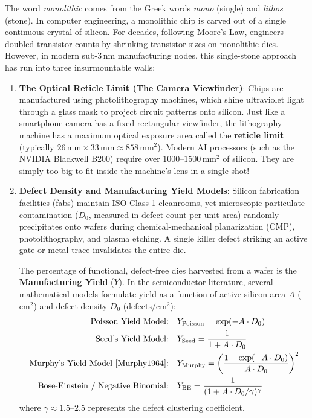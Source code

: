 The word \emph{monolithic} comes from the Greek words \emph{mono} (single) and \emph{lithos} (stone). In computer engineering, a monolithic chip is carved out of a single continuous crystal of silicon. For decades, following Moore's Law, engineers doubled transistor counts by shrinking transistor sizes on monolithic dies. However, in modern sub-3\,nm manufacturing nodes, this single-stone approach has run into three insurmountable walls:

\begin{enumerate}
    \item \textbf{The Optical Reticle Limit (The Camera Viewfinder)}: Chips are manufactured using photolithography machines, which shine ultraviolet light through a glass mask to project circuit patterns onto silicon. Just like a smartphone camera has a fixed rectangular viewfinder, the lithography machine has a maximum optical exposure area called the \textbf{reticle limit}~\cite{Mack2007} (typically $26\,\mathrm{mm} \times 33\,\mathrm{mm} \approx 858\,\mathrm{mm^2}$). Modern AI processors (such as the NVIDIA Blackwell B200) require over $1000\text{--}1500\,\mathrm{mm^2}$ of silicon. They are simply too big to fit inside the machine's lens in a single shot!
    
    \item \textbf{Defect Density and Manufacturing Yield Models}: Silicon fabrication facilities (fabs) maintain ISO Class 1 cleanrooms, yet microscopic particulate contamination ($D_0$, measured in defect count per unit area) randomly precipitates onto wafers during chemical-mechanical planarization (CMP), photolithography, and plasma etching. A single killer defect striking an active gate or metal trace invalidates the entire die.

    The percentage of functional, defect-free dies harvested from a wafer is the \textbf{Manufacturing Yield} ($Y$). In the semiconductor literature, several mathematical models formulate yield as a function of active silicon area $A$ ($\mathrm{cm^2}$) and defect density $D_0$ ($\mathrm{defects/cm^2}$):
    \begin{align}
    \text{Poisson Yield Model:} \quad & Y_{\mathrm{Poisson}} = \exp(-A \cdot D_0) \label{eq:yield_poisson} \\
    \text{Seed's Yield Model:} \quad & Y_{\mathrm{Seed}} = \frac{1}{1 + A \cdot D_0} \label{eq:yield_seed} \\
    \text{Murphy's Yield Model~\cite{Murphy1964}:} \quad & Y_{\mathrm{Murphy}} = \left( \frac{1 - \exp(-A \cdot D_0)}{A \cdot D_0} \right)^2 \label{eq:yield_murphy} \\
    \text{Bose-Einstein / Negative Binomial:} \quad & Y_{\mathrm{BE}} = \frac{1}{(1 + A \cdot D_0 / \gamma)^\gamma} \label{eq:yield_bose}
    \end{align}
    where $\gamma \approx 1.5\text{--}2.5$ represents the defect clustering coefficient.


\end{enumerate}
